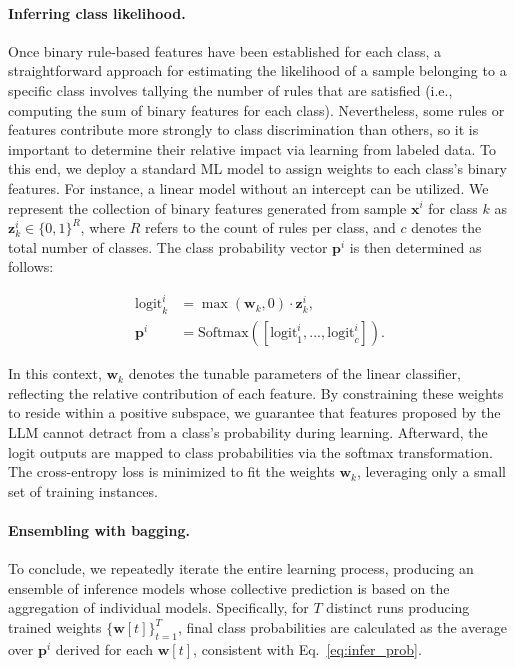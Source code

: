 \paragraph{Inferring class likelihood.} Once binary rule-based features have been established for each class, a straightforward approach for estimating the likelihood of a sample belonging to a specific class involves tallying the number of rules that are satisfied (i.e., computing the sum of binary features for each class). Nevertheless, some rules or features contribute more strongly to class discrimination than others, so it is important to determine their relative impact via learning from labeled data. To this end, we deploy a standard ML model to assign weights to each class's binary features. For instance, a linear model without an intercept can be utilized. We represent the collection of binary features generated from sample $\mathbf{x}^i$ for class $k$ as $\mathbf{z}_k^i \in \{0, 1\}^R$, where $R$ refers to the count of rules per class, and $c$ denotes the total number of classes. The class probability vector $\mathbf{p}^i$ is then determined as follows:

\begin{align}
\text{logit}_k^i &= \max(\mathbf{w}_k, 0) \cdot \mathbf{z}_k^i, \nonumber \\
\mathbf{p}^i &= \text{Softmax}({[\text{logit}_{1}^i, ..., \text{logit}_{c}^i]}). \label{eq:infer_prob}
\end{align}

In this context, $\mathbf{w}_k$ denotes the tunable parameters of the linear classifier, reflecting the relative contribution of each feature. By constraining these weights to reside within a positive subspace, we guarantee that features proposed by the LLM cannot detract from a class’s probability during learning. Afterward, the logit outputs are mapped to class probabilities via the softmax transformation. The cross-entropy loss is minimized to fit the weights $\mathbf{w}_k$, leveraging only a small set of training instances.

\vspace*{-0.12in}
\paragraph{Ensembling with bagging.} To conclude, we repeatedly iterate the entire learning process, producing an ensemble of inference models whose collective prediction is based on the aggregation of individual models. Specifically, for $T$ distinct runs producing trained weights $\{\mathbf{w}[t]\}_{t=1}^T$, final class probabilities are calculated as the average over $\mathbf{p}^i$ derived for each $\mathbf{w}[t]$, consistent with Eq.~\ref{eq:infer_prob}.

